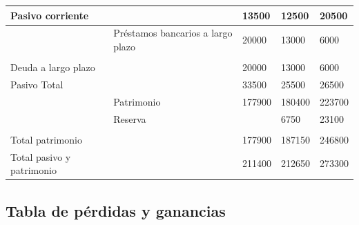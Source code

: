 \documentclass[11pt,leqno]{article}
\begin{document}
\begin{table}[H]
\begin{tabular}{@{}lllll@{}}
Pasivo corriente           &                                   & 13500  & 12500  & 20500  \\ \midrule
                           & Préstamos bancarios a largo plazo & 20000  & 13000  & 6000   \\
                           &                                   &        &        &        \\
Deuda a largo plazo        &                                   & 20000  & 13000  & 6000   \\ \midrule
Pasivo Total               &                                   & 33500  & 25500  & 26500  \\ \midrule
                           & Patrimonio                        & 177900 & 180400 & 223700 \\
                           & Reserva                           &        & 6750   & 23100  \\
                           &                                   &        &        &        \\
Total patrimonio           &                                   & 177900 & 187150 & 246800 \\ \midrule
Total pasivo y patrimonio  &                                   & 211400 & 212650 & 273300 \\ \bottomrule
\end{tabular}
\end{table}



\subsection{Tabla de pérdidas y ganancias}
\end{document}
